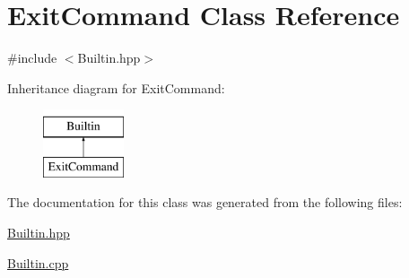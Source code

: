 \hypertarget{classExitCommand}{
\section{ExitCommand Class Reference}
\label{classExitCommand}
}


{\ttfamily \#include $<$Builtin.hpp$>$}

Inheritance diagram for ExitCommand:\begin{figure}[H]
\begin{center}
\leavevmode
\includegraphics[height=2.000000cm]{classExitCommand}
\end{center}
\end{figure}


The documentation for this class was generated from the following files:\begin{DoxyCompactItemize}
\item 
\hyperlink{Builtin_8hpp}{Builtin.hpp}\item 
\hyperlink{Builtin_8cpp}{Builtin.cpp}\end{DoxyCompactItemize}

